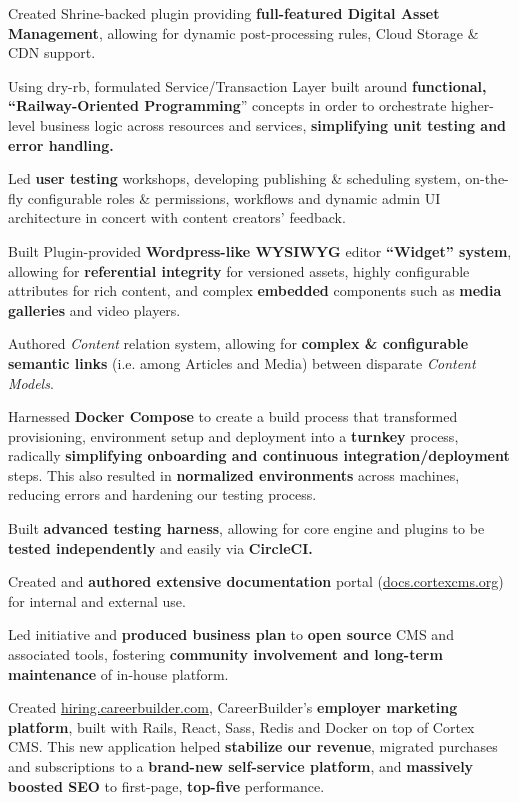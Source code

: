 \begin{cventries}
{\begin{cvitems}
        \item {Created Shrine-backed plugin providing \textbf{full-featured Digital Asset Management}, allowing for dynamic post-processing rules, Cloud Storage \& CDN support.}
        \item {Using dry-rb, formulated Service/Transaction Layer built around \textbf{functional, “Railway-Oriented Programming}” concepts in order to orchestrate higher-level business logic across resources and services, \textbf{simplifying unit testing and error handling.}}
        \item {Led \textbf{user testing} workshops, developing publishing \& scheduling system, on-the-fly configurable roles \& permissions, workflows and dynamic admin UI architecture in concert with content creators’ feedback.}
        \item {Built Plugin-provided \textbf{Wordpress-like WYSIWYG} editor \textbf{“Widget” system}, allowing for \textbf{referential integrity} for versioned assets, highly configurable attributes for rich content, and complex \textbf{embedded} components such as \textbf{media galleries} and video players.}
        \item {Authored \textit{Content} relation system, allowing for \textbf{complex \& configurable semantic links} (i.e. among Articles and Media) between disparate \textit{Content Models}.}
        \item {Harnessed \textbf{Docker Compose} to create a build process that transformed provisioning, environment setup and deployment into a \textbf{turnkey} process, radically \textbf{simplifying onboarding and continuous integration/deployment} steps. This also resulted in \textbf{normalized environments} across machines, reducing errors and hardening our testing process.}
        \item {Built \textbf{advanced testing harness}, allowing for core engine and plugins to be \textbf{tested independently} and easily via \textbf{CircleCI.}}
        \item {Created and \textbf{authored extensive documentation} portal (\url{docs.cortexcms.org}) for internal and external use.}
        \item {Led initiative and \textbf{produced business plan} to \textbf{open source} CMS and associated tools, fostering \textbf{community involvement and long-term maintenance} of in-house platform.}
        \\[2mm]
        \item {Created \url{hiring.careerbuilder.com}, CareerBuilder’s \textbf{employer marketing platform}, built with Rails, React, Sass, Redis and Docker on top of Cortex CMS. This new application helped \textbf{stabilize our revenue}, migrated purchases and subscriptions to a \textbf{brand-new self-service platform}, and \textbf{massively boosted SEO} to first-page, \textbf{top-five} performance.}

\end{cvitems}}
\end{cventries}
